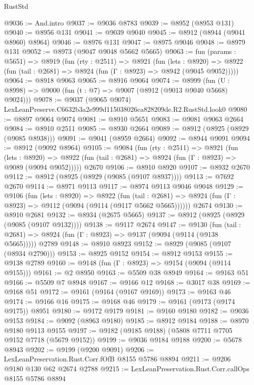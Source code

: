 \begin{lexlean}{RustStd}
\begin{coremodule}
@9036 := And.intro
@9037 := @9036 @8783
@9039 := @8952 (@8953 @131)
@9040 := @8956 @131
@9041 := @9039 @9040
@9045 := @8912 (@8944 (@9041 @8960) @8964)
@9046 := @8976 @131
@9047 := @8975 @9046
@9048 := @8979 @131
@9052 := @8973 (@9047 @9048 @5662 @5665)
@9063 := fun (params : @5651) =>
  @8919
    (fun (rty : @2511) =>
    @8921
      (fun (lets : @8920) =>
      @8922 (fun (tail : @2681) => @8924 (fun (Γ : @8923) => @8942 (@9045 @9052)))))
@9064 := @8918 @9063
@9065 := @8916 @9064
@9074 := @8999 (fun (U : @8998) => @9000 (fun (t : @7) => @9007 (@8912 (@9013 @9040 @5668) @9024)))
@9078 := @9037 (@9065 @9074) LexLeanPreserve.C6632b3a2e999d115038026ca828209de.R2.RustStd.look0
@9080 := @8897 @9064 @9074
@9081 := @8910 @5651
@9083 := @9081 @9063 @2664
@9084 := @8910 @2511
@9085 := @8930 @2664
@9089 := @8912 (@8925 (@8929 (@9085 @8938)))
@9091 := @9041 (@8959 @2664)
@9092 := @8944 @9091
@9094 := @8912 (@9092 @8964)
@9105 := @9084
    (fun (rty : @2511) =>
    @8921
      (fun (lets : @8920) =>
      @8922 (fun (tail : @2681) => @8924 (fun (Γ : @8923) => @9089 (@9094 @9052)))))
    @2670
@9106 := @8910 @8920
@9107 := @8932 @2670
@9112 := @8912 (@8925 (@8929 (@9085 (@9107 @8937))))
@9113 := @7692 @2670
@9114 := @8971 @9113
@9117 := @8974 @9113 @9046 @9048
@9129 := @9106
    (fun (lets : @8920) =>
    @8922
      (fun (tail : @2681) => @8924 (fun (Γ : @8923) => @9112 (@9094 (@9114 (@9117 @5662 @5665))))))
    @2674
@9130 := @8910 @2681
@9132 := @8934 (@2675 @5665)
@9137 := @8912 (@8925 (@8929 (@9085 (@9107 @9132))))
@9138 := @9117 @2674
@9147 := @9130
    (fun (tail : @2681) => @8924 (fun (Γ : @8923) => @9137 (@9094 (@9114 (@9138 @5665)))))
    @2789
@9148 := @8910 @8923
@9152 := @8929 (@9085 (@9107 (@8934 @2790)))
@9153 := @8925 @9152
@9154 := @8912 @9153
@9155 := @9138 @2789
@9160 := @9148 (fun (Γ : @8923) => @9154 (@9094 (@9114 @9155)))
@9161 := @2 @8950
@9163 := @5509 @38 @8949
@9164 := @9163 @51
@9166 := @5509 @7 @8948
@9167 := @9166 @12
@9168 := @3017 @38
@9169 := @9168 @51
@9172 := @9161 (@9164 (@9167 @9169))
@9173 := @9163 @46
@9174 := @9166 @16
@9175 := @9168 @46
@9179 := @9161 (@9173 (@9174 @9175)) @8951
@9180 := @9172 @9179
@9181 := @9160 @9180
@9182 := @9036 @9153
@9184 := @9092 (@8963 @9180)
@9185 := @8912 @9184
@9188 := @8970 @9180 @9113 @9155
@9197 := @9182 (@9185 @9188) (@5808 @7711 @7705 @9152 @7718 (@5679 @9152))
@9199 := @9036 @9184 @9188
@9200 := @5678 @8943
@9202 := @9199 (@9200 @9091)
@9206 := LexLeanPreservation.Rust.Corr.fOfB @8155 @5786 @8894
@9211 := @9206 @9180 @130 @62 @2674 @2788
@9215 := LexLeanPreservation.Rust.Corr.callOps @8155 @5786 @8894

\end{coremodule}
\end{lexlean}
